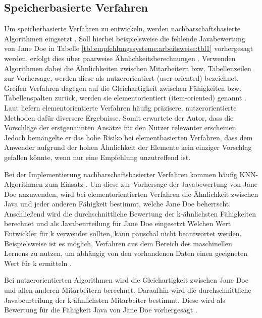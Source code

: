 \subsection{Speicherbasierte Verfahren}
\label{ch:empfehlungssysteme:cf:speicherbasiert}
Um speicherbasierte Verfahren zu entwickeln, werden nachbarschaftsbasierte Algorithmen eingsetzt \cite[S. 29]{recommenderSystems:2016}. Soll hierbei beispielsweise die fehlende Javabewertung von Jane Doe in Tabelle \ref{tbl:empfehlungssysteme:arbeitsweise:tbl1} vorhergesagt werden, erfolgt dies über paarweise Ähnlichkeitsberechnungen \cite[S. 2f.]{bharti:2019}. Verwenden Algorithmen dabei die Ähnlichkeiten zwischen Mitarbeitern bzw. Tabellenzeilen zur Vorhersage, werden diese als nutzerorientiert (user-oriented) bezeichnet. Greifen Verfahren dagegen auf die Gleichartigkeit zwischen Fähigkeiten bzw. Tabellenspalten zurück, werden sie elementorientiert (item-oriented) genannt \cite[S. 1f.]{duong:2018}. Laut \textcite[S. 42]{recommenderSystems:2016} liefern elementorientierte Verfahren häufig präzisere, nutzerorientierte Methoden dafür diversere Ergebnisse. Somit erwartete der Autor, dass die Vorschläge der erstgenannten Ansätze für den Nutzer relevanter erscheinen. Jedoch bemängelte er das hohe Risiko bei elementbasierten Verfahren, dass dem Anwender aufgrund der hohen Ähnlichkeit der Elemente kein einziger Vorschlag gefallen könnte, wenn nur eine Empfehlung unzutreffend ist.

Bei der Implementierung nachbarschaftsbasierter Verfahren kommen häufig \ac{KNN}-Algorithmen zum Einsatz \cite[S. 1]{nayak:2018}. Um diese zur Vorhersage der Javabewertung von Jane Doe anzuwenden, wird bei elementorientierten Verfahren die Ähnlichkeit zwischen Java und jeder anderen Fähigkeit bestimmt, welche Jane Doe beherrscht. Anschließend wird die durchschnittliche Bewertung der k-ähnlichsten Fähigkeiten berechnet und als Javabeurteilung für Jane Doe eingesetzt \cite[S. 2]{hao:2013} Welchen Wert Entwickler für k verwendet sollten, kann pauschal nicht beantwortet werden. Beispielsweise ist es möglich, Verfahren aus dem Bereich des maschinellen Lernens zu nutzen, um abhängig von den vorhandenen Daten einen geeigneten Wert für k ermitteln \cite[S. 2f.]{jiang:2007}.

Bei nutzerorientierten Algorithmen wird die Gleichartigkeit zwischen Jane Doe und allen anderen Mitarbeitern berechnet. Daraufhin wird die durchschnittliche Javabeurteilung der k-ähnlichsten Mitarbeiter bestimmt. Diese wird als Bewertung für die Fähigkeit Java von Jane Doe vorhergesagt \cite[S. 2f.]{hao:2013}.

